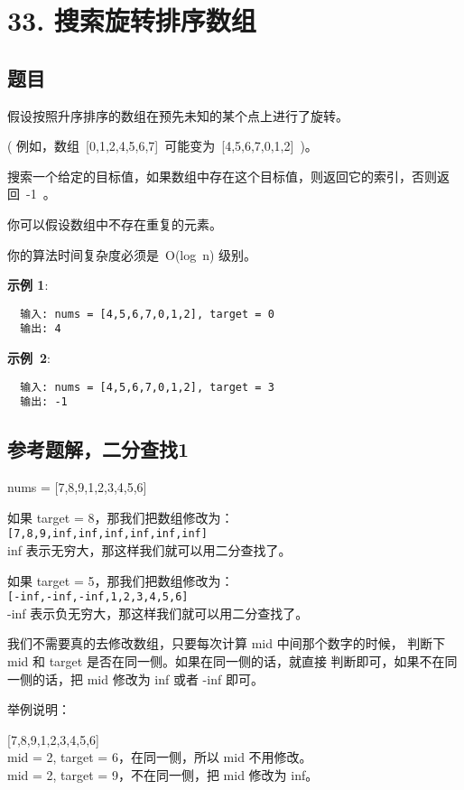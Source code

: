 \newpage
\section{33. 搜索旋转排序数组}
\label{leetcode:33}

\subsection{题目}

假设按照升序排序的数组在预先未知的某个点上进行了旋转。

( 例如，数组 [0,1,2,4,5,6,7] 可能变为 [4,5,6,7,0,1,2] )。

搜索一个给定的目标值，如果数组中存在这个目标值，则返回它的索引，否则返回 -1 。

你可以假设数组中不存在重复的元素。

你的算法时间复杂度必须是 O(log n) 级别。

\textbf{示例 1}:

\begin{verbatim}
  输入: nums = [4,5,6,7,0,1,2], target = 0
  输出: 4
\end{verbatim}

\textbf{示例 2}:

\begin{verbatim}
  输入: nums = [4,5,6,7,0,1,2], target = 3
  输出: -1
\end{verbatim}

\subsection{参考题解，二分查找1}

nums = [7,8,9,1,2,3,4,5,6]

如果 target = 8，那我们把数组修改为：\\
\verb|[7,8,9,inf,inf,inf,inf,inf,inf]| \\
inf 表示无穷大，那这样我们就可以用二分查找了。

如果 target = 5，那我们把数组修改为：\\
\verb|[-inf,-inf,-inf,1,2,3,4,5,6]| \\
-inf 表示负无穷大，那这样我们就可以用二分查找了。

我们不需要真的去修改数组，只要每次计算 mid 中间那个数字的时候，
判断下 mid 和 target 是否在同一侧。如果在同一侧的话，就直接
判断即可，如果不在同一侧的话，把 mid 修改为 inf 或者 -inf 即可。

举例说明：

[7,8,9,1,2,3,4,5,6] \\
mid = 2, target = 6，在同一侧，所以 mid 不用修改。\\
mid = 2, target = 9，不在同一侧，把 mid 修改为 inf。

